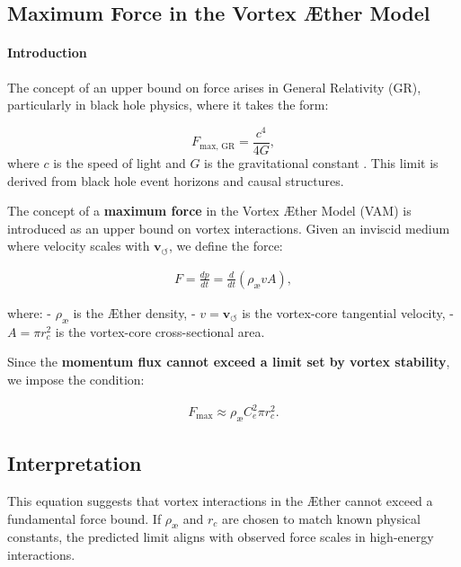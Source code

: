 

\subsection{Maximum Force in the Vortex Æther Model}


\paragraph*{Introduction}
The concept of an upper bound on force arises in General Relativity (GR), particularly in black hole physics, where it takes the form:


\begin{equation*}
    F_\text{max, GR} = \frac{c^4}{4G},
\end{equation*}
where $c$ is the speed of light and $G$ is the gravitational constant \cite{Schiller2006}. This limit is derived from black hole event horizons and causal structures.


The concept of a \textbf{maximum force} in the Vortex Æther Model (VAM) is introduced as an upper bound on vortex interactions. Given an inviscid medium where velocity scales with \( \mathbf{v}_{\scriptscriptstyle\boldsymbol{\circlearrowleft}} \), we define the force:

\begin{align}
    F = \frac{dp}{dt} = \frac{d}{dt} (\rho_{\text{\ae}} v A),
\end{align}

where:
- \( \rho_{\text{\ae}} \) is the Æther density,
- \( v = \mathbf{v}_{\scriptscriptstyle\boldsymbol{\circlearrowleft}} \) is the vortex-core tangential velocity,
- \( A = \pi r_c^2 \) is the vortex-core cross-sectional area.

Since the \textbf{momentum flux cannot exceed a limit set by vortex stability}, we impose the condition:

\begin{align}
    F_{\max} \approx \rho_{\text{\ae}} C_e^2 \pi r_c^2.
\end{align}

\subsection{Interpretation}

This equation suggests that vortex interactions in the Æther cannot exceed a fundamental force bound. If \( \rho_{\text{\ae}} \) and \( r_c \) are chosen to match known physical constants, the predicted limit aligns with observed force scales in high-energy interactions.

